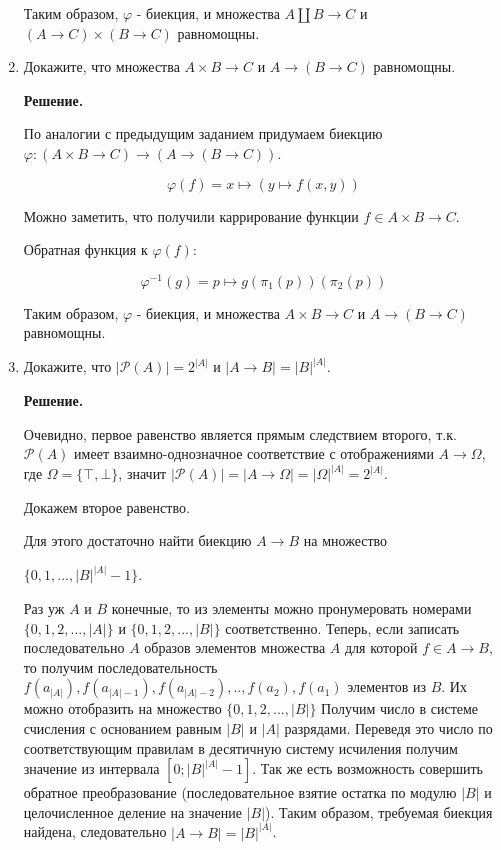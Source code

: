 \begin{enumerate}
Таким образом, $\varphi$ - биекция, и множества $A \amalg B \to C$ и $(A \to C) \times (B \to C)$ равномощны.

\item Докажите, что множества $A \times B \to C$ и $A \to (B \to C)$ равномощны.

\textbf{Решение.} 

По аналогии с предыдущим заданием придумаем биекцию $\varphi : (A \times B \to C)\to (A \to (B \to C))$.

$$\varphi(f) = x \mapsto (y \mapsto f(x, y))$$

Можно заметить, что получили каррирование функции $f \in A \times B \to C$.

Обратная функция к $\varphi(f)$:

$$\varphi^{-1}(g) = p \mapsto g(\pi_1(p))(\pi_2(p))$$

Таким образом, $\varphi$ - биекция, и множества $A \times B \to C$ и $A \to (B \to C)$ равномощны.

\item Докажите, что $|\mathcal{P}(A)| = 2^{|A|}$ и $|A \to B| = |B|^{|A|}$.

\textbf{Решение.} 

Очевидно, первое равенство является прямым следствием второго, т.к. $\mathcal{P}(A)$ имеет взаимно-однозначное соответствие с отображениями $A \to \Omega$, где $\Omega = \{ \top, \bot \}$, значит $|\mathcal{P}(A)| = |A \to \Omega| = |\Omega|^{|A|} = 2^{|A|}$.

Докажем второе равенство.

Для этого достаточно найти биекцию $A \to B$ на множество 

$\{0, 1, ..., |B|^{|A|} - 1 \}$.

Раз уж $A$ и $B$ конечные, то из элементы можно пронумеровать номерами $\{0, 1, 2,..., |A|\}$ и $\{0, 1, 2,..., |B|\}$ соответственно. Теперь, если записать последовательно $A$ образов элементов множества $A$ для которой $f \in A \to B$, то получим последовательность $f(a_{|A|}), f(a_{|A| - 1}), f(a_{|A| - 2}), .., f(a_2), f(a_1)$ элементов из $B$. Их можно отобразить на множество $\{0, 1, 2,..., |B|\}$ Получим число в системе счисления с основанием равным $|B|$ и $|A|$ разрядами. Переведя это число по соответствующим правилам в десятичную систему исчиления получим значение из интервала $[0; |B|^{|A|} - 1]$. Так же есть возможность совершить обратное преобразование (последовательное взятие остатка по модулю $|B|$ и целочисленное деление на значение $|B|$). Таким образом, требуемая биекция найдена, следовательно $|A \to B| = |B|^{|A|}$.

\end{enumerate}
